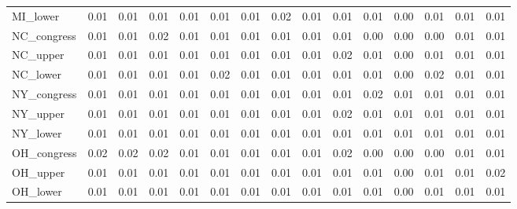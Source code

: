 \begin{tabular}{lrrrrrrrrrrrrrr}
MI\_lower    &   0.01 &           0.01 &       0.01 &       0.01 &            0.01 &         0.01 &           0.02 &                   0.01 &            0.01 &       0.01 &          0.00 &           0.01 &           0.01 &            0.01 \\
NC\_congress &   0.01 &           0.01 &       0.02 &       0.01 &            0.01 &         0.01 &           0.01 &                   0.01 &            0.01 &       0.00 &          0.00 &           0.00 &           0.01 &            0.01 \\
NC\_upper    &   0.01 &           0.01 &       0.01 &       0.01 &            0.01 &         0.01 &           0.01 &                   0.01 &            0.02 &       0.01 &          0.00 &           0.01 &           0.01 &            0.01 \\
NC\_lower    &   0.01 &           0.01 &       0.01 &       0.01 &            0.02 &         0.01 &           0.01 &                   0.01 &            0.01 &       0.01 &          0.00 &           0.02 &           0.01 &            0.01 \\
NY\_congress &   0.01 &           0.01 &       0.01 &       0.01 &            0.01 &         0.01 &           0.01 &                   0.01 &            0.01 &       0.02 &          0.01 &           0.01 &           0.01 &            0.01 \\
NY\_upper    &   0.01 &           0.01 &       0.01 &       0.01 &            0.01 &         0.01 &           0.01 &                   0.01 &            0.02 &       0.01 &          0.01 &           0.01 &           0.01 &            0.01 \\
NY\_lower    &   0.01 &           0.01 &       0.01 &       0.01 &            0.01 &         0.01 &           0.01 &                   0.01 &            0.01 &       0.01 &          0.01 &           0.01 &           0.01 &            0.01 \\
OH\_congress &   0.02 &           0.02 &       0.02 &       0.01 &            0.01 &         0.01 &           0.01 &                   0.01 &            0.02 &       0.00 &          0.00 &           0.00 &           0.01 &            0.01 \\
OH\_upper    &   0.01 &           0.01 &       0.01 &       0.01 &            0.01 &         0.01 &           0.01 &                   0.01 &            0.01 &       0.01 &          0.00 &           0.01 &           0.01 &            0.02 \\
OH\_lower    &   0.01 &           0.01 &       0.01 &       0.01 &            0.01 &         0.01 &           0.01 &                   0.01 &            0.01 &       0.01 &          0.00 &           0.01 &           0.01 &            0.01 \\

\end{tabular}
